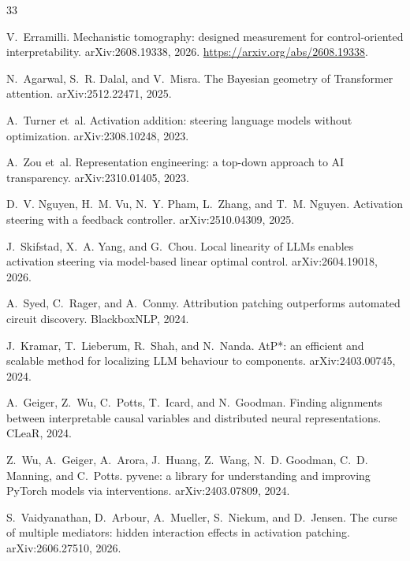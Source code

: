 \begin{thebibliography}{33}

V.~Erramilli.
\newblock Mechanistic tomography: designed measurement for control-oriented
  interpretability.
\newblock arXiv:2608.19338, 2026.
\newblock \url{https://arxiv.org/abs/2608.19338}.

N.~Agarwal, S.~R. Dalal, and V.~Misra.
\newblock The Bayesian geometry of Transformer attention.
\newblock arXiv:2512.22471, 2025.

A.~Turner et~al.
\newblock Activation addition: steering language models without optimization.
\newblock arXiv:2308.10248, 2023.

A.~Zou et~al.
\newblock Representation engineering: a top-down approach to AI transparency.
\newblock arXiv:2310.01405, 2023.

D.~V. Nguyen, H.~M. Vu, N.~Y. Pham, L.~Zhang, and T.~M. Nguyen.
\newblock Activation steering with a feedback controller.
\newblock arXiv:2510.04309, 2025.

J.~Skifstad, X.~A. Yang, and G.~Chou.
\newblock Local linearity of LLMs enables activation steering via model-based
  linear optimal control.
\newblock arXiv:2604.19018, 2026.

A.~Syed, C.~Rager, and A.~Conmy.
\newblock Attribution patching outperforms automated circuit discovery.
\newblock BlackboxNLP, 2024.

J.~Kramar, T.~Lieberum, R.~Shah, and N.~Nanda.
\newblock AtP*: an efficient and scalable method for localizing LLM behaviour
  to components.
\newblock arXiv:2403.00745, 2024.

A.~Geiger, Z.~Wu, C.~Potts, T.~Icard, and N.~Goodman.
\newblock Finding alignments between interpretable causal variables and
  distributed neural representations.
\newblock CLeaR, 2024.

Z.~Wu, A.~Geiger, A.~Arora, J.~Huang, Z.~Wang, N.~D. Goodman,
C.~D. Manning, and C.~Potts.
\newblock pyvene: a library for understanding and improving PyTorch models via
  interventions.
\newblock arXiv:2403.07809, 2024.

S.~Vaidyanathan, D.~Arbour, A.~Mueller, S.~Niekum, and D.~Jensen.
\newblock The curse of multiple mediators: hidden interaction effects in
  activation patching.
\newblock arXiv:2606.27510, 2026.


\end{thebibliography}
